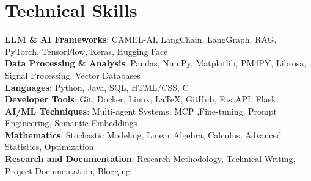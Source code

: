 \documentclass[letterpaper,11pt]{article}
\begin{document}
\section{Technical Skills}
 \begin{itemize}[leftmargin=0.15in, label={}]
    \small{\item{
     \textbf{LLM \& AI Frameworks}{: CAMEL-AI, LangChain, LangGraph, RAG, PyTorch, TensorFlow, Keras, Hugging Face} \\
     \textbf{Data Processing \& Analysis}{: Pandas, NumPy, Matplotlib, PM4PY, Librosa, Signal Processing, Vector Databases} \\
     \textbf{Languages}{: Python, Java, SQL, HTML/CSS, C} \\
     \textbf{Developer Tools}{: Git, Docker, Linux, LaTeX, GitHub, FastAPI, Flask} \\
     \textbf{AI/ML Techniques}{: Multi-agent Systems, MCP ,Fine-tuning, Prompt Engineering, Semantic Embeddings} \\
     \textbf{Mathematics}{: Stochastic Modeling, Linear Algebra, Calculus, Advanced Statistics, Optimization} \\
     \textbf{Research and Documentation}{: Research Methodology, Technical Writing, Project Documentation, Blogging}
    }}
 \end{itemize}

\end{document}

